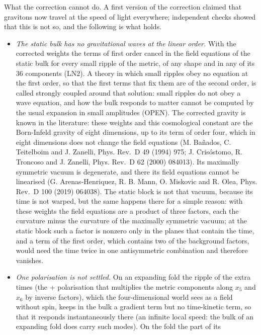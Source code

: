 \documentclass[
  10pt,
]{article}
\providecommand{\tightlist}{%
  \setlength{\itemsep}{0pt}\setlength{\parskip}{0pt}}
\begin{document}
What the correction cannot do. A first version of the correction claimed
that gravitons now travel at the speed of light everywhere; independent
checks showed that this is not so, and the following is what holds.

\begin{itemize}
\tightlist
\item
  \emph{The static bulk has no gravitational waves at the linear order.}
  With the corrected weights the terms of first order cancel in the
  field equations of the static bulk for every small ripple of the
  metric, of any shape and in any of its 36 components (LN2). A theory
  in which small ripples obey no equation at the first order, so that
  the first terms that fix them are of the second order, is called
  strongly coupled around that solution: small ripples do not obey a
  wave equation, and how the bulk responds to matter cannot be computed
  by the usual expansion in small amplitudes (OPEN). The corrected
  gravity is known in the literature: these weights and this
  cosmological constant are the Born-Infeld gravity of eight dimensions,
  up to its term of order four, which in eight dimensions does not
  change the field equations (M. Bañados, C. Teitelboim and J. Zanelli,
  Phys. Rev.~D 49 (1994) 975; J. Crisóstomo, R. Troncoso and J. Zanelli,
  Phys. Rev.~D 62 (2000) 084013). Its maximally symmetric vacuum is
  degenerate, and there its field equations cannot be linearised (G.
  Arenas-Henriquez, R. B. Mann, O. Miskovic and R. Olea, Phys. Rev.~D
  100 (2019) 064038). The static block is not that vacuum, because its
  time is not warped, but the same happens there for a simple reason:
  with these weights the field equations are a product of three factors,
  each the curvature minus the curvature of the maximally symmetric
  vacuum; at the static block such a factor is nonzero only in the
  planes that contain the time, and a term of the first order, which
  contains two of the background factors, would need the time twice in
  one antisymmetric combination and therefore vanishes.
\item
  \emph{One polarisation is not settled.} On an expanding fold the
  ripple of the extra times (the + polarisation that multiplies the
  metric components along \(x_5\) and \(x_6\) by inverse factors), which
  the four-dimensional world sees as a field without spin, keeps in the
  bulk a gradient term but no time-kinetic term, so that it responds
  instantaneously there (an infinite local speed: the bulk of an
  expanding fold does carry such modes). On the fold the part of its

\end{itemize}
\end{document}

